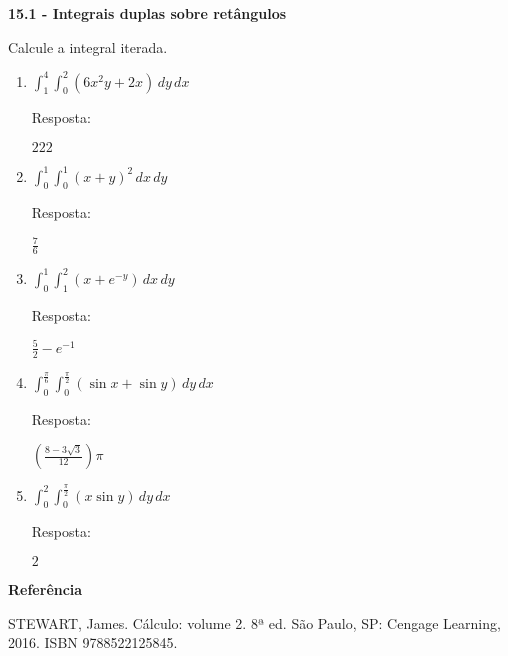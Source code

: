 \documentclass[a4paper, 12pt]{article}
\newcommand{\resposta}[1]{\hfill{{\begin{scriptsize} Resposta: \end{scriptsize}} #1}}
\begin{document}
	\thispagestyle{empty}

	\begin{large} 
	\begin{center}		
		\textbf{15.1 - Integrais duplas sobre retângulos}		
	\end{center}
	\end{large} 
	
	\vspace{5mm}
	
	Calcule a integral iterada.
	
	\begin{enumerate} %
		
		\item $\displaystyle \int_{1}^{4} \int_{0}^{2} (6x^{2}y + 2x) \, dy \, dx$ 
		\resposta{$222$}
		
		\item $\displaystyle \int_{0}^{1} \int_{0}^{1} (x + y)^2 \, dx \, dy$ 
		\resposta{$\frac{7}{6}$}
		
		\item $\displaystyle \int_{0}^{1} \int_{1}^{2} (x + e^{-y}) \, dx \, dy$ 
		\resposta{$\frac{5}{2} - e^{-1}$}
		
		\item $\displaystyle \int_{0}^{\frac{\pi}{6}} \int_{0}^{\frac{\pi}{2}} (\sin x + \sin y) \, dy \, dx$ 
		\resposta{$(\frac{8 - 3\sqrt{3}}{12})\pi$}
		
		\item $\displaystyle \int_{0}^{2} \int_{0}^{\frac{\pi}{2}} (x \sin y) \, dy \, dx$ 
		\resposta{$2$}
		
	\end{enumerate}
		
	\vspace{5mm}	
	
	\textbf{Referência}	
	
	\begin{footnotesize}
		STEWART, James. Cálculo: volume 2. 8ª ed. São Paulo, SP: Cengage Learning, 2016. ISBN 9788522125845.
	\end{footnotesize}
\end{document}
